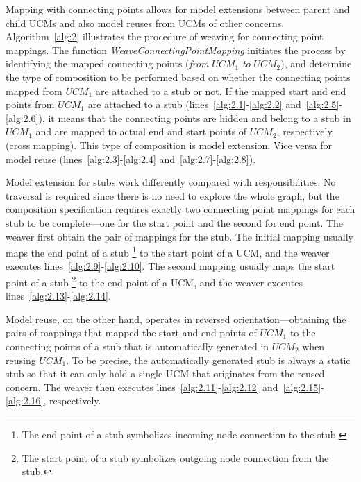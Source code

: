Mapping with connecting points allows for model extensions between parent and child UCMs and also model reuses from UCMs of other concerns. Algorithm~\ref{alg:2} illustrates the procedure of weaving for connecting point mappings. The function \emph{WeaveConnectingPointMapping} initiates the process by identifying the mapped connecting points (\emph{from} $UCM_1$ \emph{to} $UCM_2$), and determine the type of composition to be performed based on whether the connecting points mapped from $UCM_1$ are attached to a stub or not. If the mapped start and end points from $UCM_1$ are attached to a stub (lines~\ref{alg:2.1}-\ref{alg:2.2} and~\ref{alg:2.5}-\ref{alg:2.6}), it means that the connecting points are hidden and belong to a stub in $UCM_1$ and are mapped to actual end and start points of $UCM_2$, respectively (cross mapping). This type of composition is model extension. Vice versa for model reuse (lines~\ref{alg:2.3}-\ref{alg:2.4} and~\ref{alg:2.7}-\ref{alg:2.8}).

Model extension for stubs work differently compared with responsibilities. No traversal is required since there is no need to explore the whole graph, but the composition specification requires exactly two connecting point mappings for each stub to be complete---one for the start point and the second for end point. The weaver first obtain the pair of mappings for the stub. The initial mapping usually maps the end point of a stub \footnote{The end point of a stub symbolizes incoming node connection to the stub.} to the start point of a UCM, and the weaver executes lines~\ref{alg:2.9}-\ref{alg:2.10}. The second mapping usually maps the start point of a stub \footnote{The start point of a stub symbolizes outgoing node connection from the stub.} to the end point of a UCM, and the weaver executes lines~\ref{alg:2.13}-\ref{alg:2.14}.

Model reuse, on the other hand, operates in reversed orientation---obtaining the pairs of mappings that mapped the start and end points of $UCM_1$ to the connecting points of a stub that is automatically generated in $UCM_2$ when reusing $UCM_1$. To be precise, the automatically generated stub is always a static stub so that it can only hold a single UCM that originates from the reused concern. The weaver then executes lines~\ref{alg:2.11}-\ref{alg:2.12} and~\ref{alg:2.15}-\ref{alg:2.16}, respectively.

